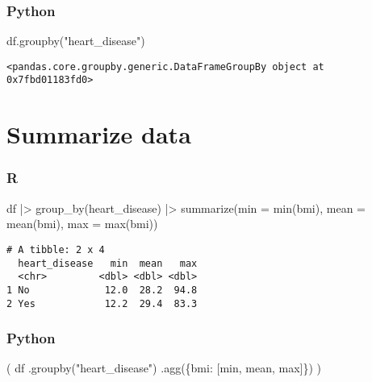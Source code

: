 \documentclass[
  letterpaper,
  DIV=11,
  numbers=noendperiod]{scrreprt}
\newenvironment{Shaded}{\begin{snugshade}}{\end{snugshade}}
\newcommand{\AttributeTok}[1]{\textcolor[rgb]{0.40,0.46,0.14}{#1}}
\newcommand{\FunctionTok}[1]{\textcolor[rgb]{0.28,0.35,0.67}{#1}}
\newcommand{\NormalTok}[1]{\textcolor[rgb]{0.00,0.46,0.62}{#1}}
\newcommand{\SpecialCharTok}[1]{\textcolor[rgb]{0.37,0.37,0.37}{#1}}
\newcommand{\StringTok}[1]{\textcolor[rgb]{0.13,0.47,0.30}{#1}}
\begin{document}
\hypertarget{python-28}{%
\subsubsection{Python}\label{python-28}}

\begin{Shaded}
\begin{Highlighting}[]
\NormalTok{df.groupby(}\StringTok{"heart\_disease"}\NormalTok{)}
\end{Highlighting}
\end{Shaded}

\begin{verbatim}
<pandas.core.groupby.generic.DataFrameGroupBy object at 0x7fbd01183fd0>
\end{verbatim}

\hypertarget{summarize-data}{%
\section{Summarize data}\label{summarize-data}}

\hypertarget{r-29}{%
\subsubsection{R}\label{r-29}}

\begin{Shaded}
\begin{Highlighting}[]
\NormalTok{df }\SpecialCharTok{|\textgreater{}} 
    \FunctionTok{group\_by}\NormalTok{(heart\_disease) }\SpecialCharTok{|\textgreater{}} 
    \FunctionTok{summarize}\NormalTok{(}\AttributeTok{min =} \FunctionTok{min}\NormalTok{(bmi), }\AttributeTok{mean =} \FunctionTok{mean}\NormalTok{(bmi), }\AttributeTok{max =} \FunctionTok{max}\NormalTok{(bmi))}
\end{Highlighting}
\end{Shaded}

\begin{verbatim}
# A tibble: 2 x 4
  heart_disease   min  mean   max
  <chr>         <dbl> <dbl> <dbl>
1 No             12.0  28.2  94.8
2 Yes            12.2  29.4  83.3
\end{verbatim}

\hypertarget{python-29}{%
\subsubsection{Python}\label{python-29}}

\begin{Shaded}
\begin{Highlighting}[]
\NormalTok{(}
\NormalTok{    df}
\NormalTok{    .groupby(}\StringTok{"heart\_disease"}\NormalTok{)}
\NormalTok{    .agg(\{}\StringTok{\textquotesingle{}bmi\textquotesingle{}}\NormalTok{: [}\StringTok{\textquotesingle{}min\textquotesingle{}}\NormalTok{, }\StringTok{\textquotesingle{}mean\textquotesingle{}}\NormalTok{, }\StringTok{\textquotesingle{}max\textquotesingle{}}\NormalTok{]\})}
\NormalTok{)}
\end{Highlighting}
\end{Shaded}
\end{document}
